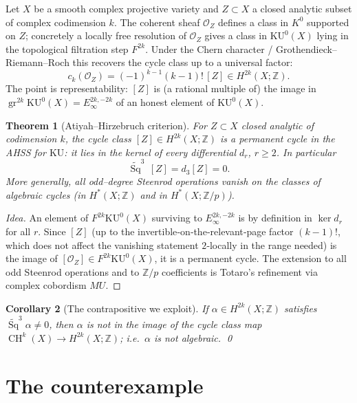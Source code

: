 \documentclass[11pt]{article}
\newtheorem{theorem}{Theorem}[section]
\newtheorem{corollary}[theorem]{Corollary}
\theoremstyle{definition}
\DeclareMathOperator{\Sq}{Sq}
\DeclareMathOperator{\CH}{CH}
\newcommand{\Z}{\mathbb{Z}}
\newcommand{\KU}{\mathrm{KU}}
\renewcommand{\O}{\mathcal{O}}
\newcommand{\gr}{\operatorname{gr}}
\begin{document}
Let $X$ be a smooth complex projective variety and $Z\subset X$ a closed analytic
subset of complex codimension $k$. The coherent sheaf $\O_Z$ defines a class in
$K^0$ supported on $Z$; concretely a locally free resolution of $\O_Z$ gives a
class in $\KU^0(X)$ lying in the topological filtration step $F^{2k}$. Under the
Chern character / Grothendieck--Riemann--Roch this recovers the cycle class up to
a universal factor:
\begin{equation}\label{eq:GRR}
  c_k(\O_Z)=(-1)^{k-1}(k-1)!\,[Z]\in H^{2k}(X;\Z).
\end{equation}
The point is representability: $[Z]$ is (a rational multiple of) the image in
$\gr^{2k}\KU^0(X)=E_\infty^{2k,-2k}$ of an honest element of $\KU^0(X)$.

\begin{theorem}[Atiyah--Hirzebruch criterion]\label{thm:criterion}
For $Z\subset X$ closed analytic of codimension $k$, the cycle class
$[Z]\in H^{2k}(X;\Z)$ is a \emph{permanent cycle} in the AHSS for $\KU$: it lies
in the kernel of every differential $d_r$, $r\ge 2$. In particular
\[
  \widetilde{\Sq}^3\,[Z]=d_3[Z]=0 .
\]
More generally, all odd--degree Steenrod operations vanish on the classes of
algebraic cycles (in $H^*(X;\Z)$ and in $H^*(X;\Z/p)$).
\end{theorem}

\begin{proof}[Idea]
An element of $F^{2k}\KU^0(X)$ surviving to $E_\infty^{2k,-2k}$ is by definition
in $\ker d_r$ for all $r$. Since $[Z]$ (up to the invertible‑on‑the‑relevant‑page
factor $(k-1)!$, which does not affect the vanishing statement $2$‑locally in the
range needed) is the image of $[\O_Z]\in F^{2k}\KU^0(X)$, it is a permanent
cycle. The extension to all odd Steenrod operations and to $\Z/p$ coefficients is
Totaro's refinement via complex cobordism $MU$.
\end{proof}

\begin{corollary}[The contrapositive we exploit]\label{cor:test}
If $\alpha\in H^{2k}(X;\Z)$ satisfies $\widetilde{\Sq}^3\alpha\neq 0$, then
$\alpha$ is \emph{not} in the image of the cycle class map
$\CH^k(X)\to H^{2k}(X;\Z)$; i.e.\ $\alpha$ is not algebraic. \qed
\end{corollary}

\section{The counterexample}
\end{document}
